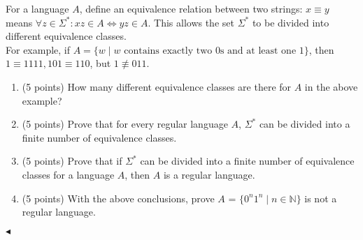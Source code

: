 \documentclass[11pt]{article}
\newenvironment{problem}[2][Problem]{\begin{trivlist}
\item[\hskip \labelsep{\bfseries#1}\hskip\labelsep{\bfseries#2.}]}{\hfill$\blacktriangleleft$\end{trivlist}}
\begin{document}
\begin{problem}{4.(20 points)}
    For a language $A$, define an equivalence relation between two strings: $x \equiv y$ means
    $\forall z\in\Sigma^* : xz\in A\Leftrightarrow yz\in A$. This allows the set $\Sigma^*$
    to be divided into different equivalence
    classes.\\
    For example, if $A = \{w \mid w \mbox{ contains exactly two }0\mbox{s and at least one }1\}$, then $1\equiv1111, 101\equiv110$, but $1\not\equiv011$.
\begin{enumerate}[label = (\alph*)]
    \item (5 points) How many different equivalence classes are there for $A$ in the above example?
    \item (5 points) Prove that for every regular language $A$, $\Sigma^*$ can be divided into a finite number of equivalence classes.
    \item (5 points) Prove that if $\Sigma^*$ can be divided into a finite number of equivalence classes for a language $A$, then $A$ is a regular language.
    \item (5 points) With the above conclusions, prove $A$ = $\{0^n1^n\mid n\in\mathbb{N}\}$ is not a regular language.
\end{enumerate}
\end{problem}
\end{document}
